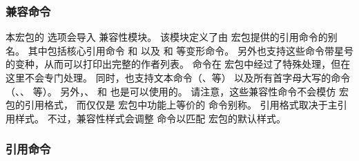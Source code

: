 \subsubsection{ 兼容命令} %
\label{use:cit:nat}


本宏包的  选项会导入  兼容性模块。
该模块定义了由  宏包提供的引用命令的别名。
其中包括核心引用命令  和  以及  和  等变形命令。
另外也支持这些命令带星号的变种，从而可以打印出完整的作者列表。
 命令在  宏包中经过了特殊处理，但在这里不会专门处理。
同时，也支持文本命令（、等）
以及所有首字母大写的命令（、、 等）。
另外，、 和  也是可以使用的。
请注意，这些兼容性命令不会模仿  宏包的引用格式，
而仅仅是  宏包中功能上等价的  命令别称。
引用格式取决于主引用样式。
不过，兼容性样式会调整  命令以匹配  宏包的默认样式。

\subsubsection[\sty{mcite} 引用命令]{ 引用命令}
\label{use:cit:mct}

